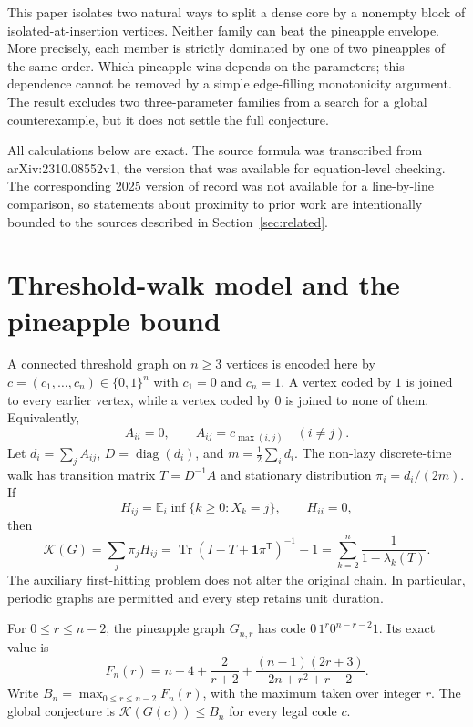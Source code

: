 \documentclass[11pt]{article}
\newcommand{\K}{\mathcal{K}}
\newcommand{\one}{\mathbf{1}}
\begin{document}
This paper isolates two natural ways to split a dense core by a nonempty block
of isolated-at-insertion vertices.  Neither family can beat the pineapple
envelope.  More precisely, each member is strictly dominated by one of two
pineapples of the same order.  Which pineapple wins depends on the parameters;
this dependence cannot be removed by a simple edge-filling monotonicity argument.
The result excludes two three-parameter families from a search for a global
counterexample, but it does not settle the full conjecture.

All calculations below are exact.  The source formula was transcribed from
arXiv:2310.08552v1, the version that was available for equation-level checking.
The corresponding 2025 version of record was not available for a line-by-line
comparison, so statements about proximity to prior work are intentionally
bounded to the sources described in Section~\ref{sec:related}.

\section{Threshold-walk model and the pineapple bound}
\label{sec:model}

A connected threshold graph on $n\geq 3$ vertices is encoded here by
$c=(c_1,\ldots,c_n)\in\{0,1\}^n$ with $c_1=0$ and $c_n=1$.  A vertex coded by
$1$ is joined to every earlier vertex, while a vertex coded by $0$ is joined
to none of them.  Equivalently,
\begin{equation}
 A_{ii}=0,
 \qquad A_{ij}=c_{\max(i,j)}\quad(i\neq j).
 \label{eq:adjacency}
\end{equation}
Let $d_i=\sum_j A_{ij}$, $D=\operatorname{diag}(d_i)$, and
$m=\frac12\sum_i d_i$.  The non-lazy discrete-time walk has transition matrix
$T=D^{-1}A$ and stationary distribution $\pi_i=d_i/(2m)$.  If
\begin{equation}
 H_{ij}=\mathbb E_i\inf\{k\geq0:X_k=j\},\qquad H_{ii}=0,
\end{equation}
then
\begin{equation}
 \K(G)=\sum_j\pi_jH_{ij}
 =\operatorname{Tr}\!\left(I-T+\one\pi^{\mathsf T}\right)^{-1}-1
 =\sum_{k=2}^n\frac{1}{1-\lambda_k(T)}.
 \label{eq:kemeny}
\end{equation}
The auxiliary first-hitting problem does not alter the original chain.  In
particular, periodic graphs are permitted and every step retains unit duration.

For $0\leq r\leq n-2$, the pineapple graph $G_{n,r}$ has code
$0\,1^r0^{n-r-2}1$.  Its exact value is~\cite[Lemma 3.14]{BreenEtAl2025}
\begin{equation}
 F_n(r)=n-4+\frac{2}{r+2}
 +\frac{(n-1)(2r+3)}{2n+r^2+r-2}.
 \label{eq:pineapple}
\end{equation}
Write $B_n=\max_{0\leq r\leq n-2}F_n(r)$, with the maximum taken over integer
$r$.  The global conjecture is $\K(G(c))\leq B_n$ for every legal code $c$.
\end{document}
